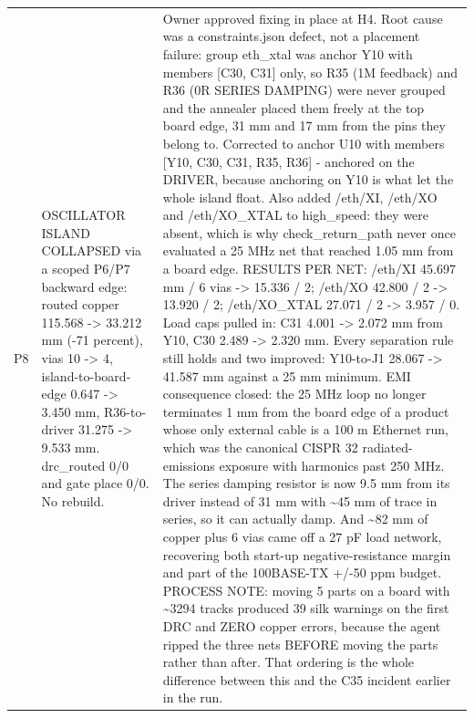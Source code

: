 \documentclass[11pt,a4paper]{article}
\begin{document}
{\begin{longtable}{lp{5.2cm}p{7.2cm}}
P8 & OSCILLATOR ISLAND COLLAPSED via a scoped P6/P7 backward edge: routed copper 115.568 -\textgreater{} 33.212 mm (-71 percent), vias 10 -\textgreater{} 4, island-to-board-edge 0.647 -\textgreater{} 3.450 mm, R36-to-driver 31.275 -\textgreater{} 9.533 mm. drc\_routed 0/0 and gate place 0/0. No rebuild. & Owner approved fixing in place at H4. Root cause was a constraints.json defect, not a placement failure: group eth\_xtal was anchor Y10 with members {[}C30, C31{]} only, so R35 (1M feedback) and R36 (0R SERIES DAMPING) were never grouped and the annealer placed them freely at the top board edge, 31 mm and 17 mm from the pins they belong to. Corrected to anchor U10 with members {[}Y10, C30, C31, R35, R36{]} - anchored on the DRIVER, because anchoring on Y10 is what let the whole island float. Also added /eth/XI, /eth/XO and /eth/XO\_XTAL to high\_speed: they were absent, which is why check\_return\_path never once evaluated a 25 MHz net that reached 1.05 mm from a board edge. RESULTS PER NET: /eth/XI 45.697 mm / 6 vias -\textgreater{} 15.336 / 2; /eth/XO 42.800 / 2 -\textgreater{} 13.920 / 2; /eth/XO\_XTAL 27.071 / 2 -\textgreater{} 3.957 / 0. Load caps pulled in: C31 4.001 -\textgreater{} 2.072 mm from Y10, C30 2.489 -\textgreater{} 2.320 mm. Every separation rule still holds and two improved: Y10-to-J1 28.067 -\textgreater{} 41.587 mm against a 25 mm minimum. EMI consequence closed: the 25 MHz loop no longer terminates 1 mm from the board edge of a product whose only external cable is a 100 m Ethernet run, which was the canonical CISPR 32 radiated-emissions exposure with harmonics past 250 MHz. The series damping resistor is now 9.5 mm from its driver instead of 31 mm with \textasciitilde{}45 mm of trace in series, so it can actually damp. And \textasciitilde{}82 mm of copper plus 6 vias came off a 27 pF load network, recovering both start-up negative-resistance margin and part of the 100BASE-TX +/-50 ppm budget. PROCESS NOTE: moving 5 parts on a board with \textasciitilde{}3294 tracks produced 39 silk warnings on the first DRC and ZERO copper errors, because the agent ripped the three nets BEFORE moving the parts rather than after. That ordering is the whole difference between this and the C35 incident earlier in the run. \\

\end{longtable}}
\end{document}
